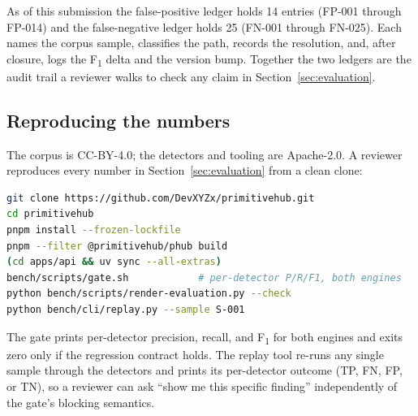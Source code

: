 As of this submission the false-positive ledger holds 14 entries
(FP-001 through FP-014) and the false-negative ledger holds 25 (FN-001
through FN-025). Each names the corpus sample, classifies the path,
records the resolution, and, after closure, logs the F\textsubscript{1}
delta and the version bump. Together the two ledgers are the audit trail
a reviewer walks to check any claim in Section~\ref{sec:evaluation}.

\subsection{Reproducing the numbers}

The corpus is CC-BY-4.0; the detectors and tooling are Apache-2.0. A
reviewer reproduces every number in Section~\ref{sec:evaluation} from a
clean clone:

\begin{lstlisting}[language=bash]
git clone https://github.com/DevXYZx/primitivehub.git
cd primitivehub
pnpm install --frozen-lockfile
pnpm --filter @primitivehub/phub build
(cd apps/api && uv sync --all-extras)
bench/scripts/gate.sh            # per-detector P/R/F1, both engines
python bench/scripts/render-evaluation.py --check
python bench/cli/replay.py --sample S-001
\end{lstlisting}

The gate prints per-detector precision, recall, and F\textsubscript{1}
for both engines and exits zero only if the regression contract holds.
The replay tool re-runs any single sample through the detectors and
prints its per-detector outcome (TP, FN, FP, or TN), so a reviewer can
ask ``show me this specific finding'' independently of the gate's
blocking semantics.
